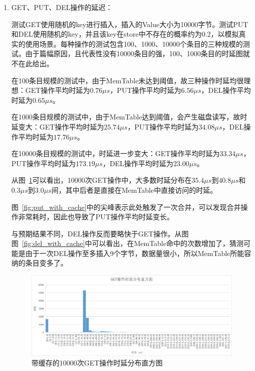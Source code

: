 \documentclass[fontset=windows]{article}
\begin{document}
\begin{enumerate}
    \item GET、PUT、DEL操作的延迟：
    
    测试GET使用随机的key进行插入，插入的Value大小为10000字节。测试PUT和DEL使用随机的key，并且该key在store中不存在的概率约为0.2，以模拟真实的使用场景。每种操作的测试包含100、1000、10000个条目的三种规模的测试。由于篇幅原因，且代表性没有10000条目的强，100、1000条目的时延图就不在此给出。
    
    在100条目规模的测试中，由于MemTable未达到阈值，故三种操作时延均很理想：GET操作平均时延为$0.76 \mu s$，PUT操作平均时延为$6.56 \mu s$，DEL操作平均时延为$0.65 \mu s$。
    
    在1000条目规模的测试中，由于MemTable达到阈值，会产生磁盘读写，故时延变大：GET操作平均时延为$25.74 \mu s$，PUT操作平均时延为$34.08 \mu s$，DEL操作平均时延为$17.76 \mu s$。
    
    在10000条目规模的测试中，时延进一步变大：GET操作平均时延为$33.34 \mu s$，PUT操作平均时延为$173.19 \mu s$，DEL操作平均时延为$23.00 \mu s$。
    
    从图~\ref{fig:get_with_cache}可以看出，10000次GET操作中，大多数时延分布在$35.4 \mu s$到$40.8 \mu s$和$0.3 \mu s$到$3.0 \mu s$间，其中后者是直接在MemTable中直接访问的时延。
    
    图~\ref{fig:put_with_cache}中的尖峰表示此处触发了一次合并，可以发现合并操作非常耗时，因此也导致了PUT操作平均时延变长。
    
    与预期结果不同，DEL操作反而要略快于GET操作。从图图~\ref{fig:del_with_cache}中可以看出，在MemTable命中的次数增加了，猜测可能是由于一次DEL操作至多插入9个字节，数据量很小，所以MemTable所能容纳的条目变多了。
    
\begin{figure}[h!]
\centering
\includegraphics[scale=0.5]{get_with_cache}
\caption{带缓存的10000次GET操作时延分布直方图}
\label{fig:get_with_cache}
\end{figure}


\end{enumerate}
\end{document}
